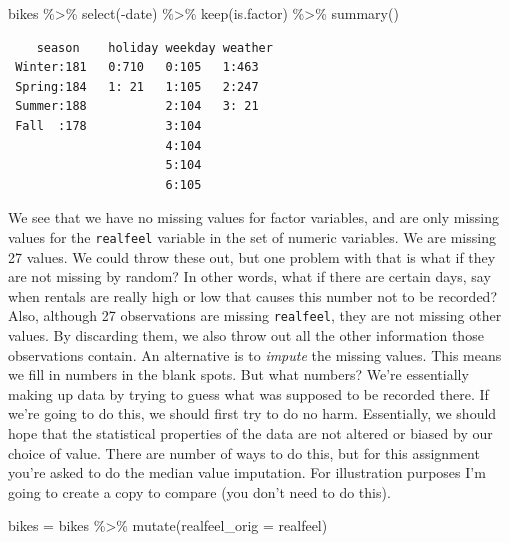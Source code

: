 \documentclass[
  letterpaper,
  DIV=11,
  numbers=noendperiod]{scrartcl}
\newenvironment{Shaded}{\begin{snugshade}}{\end{snugshade}}
\newcommand{\AttributeTok}[1]{\textcolor[rgb]{0.40,0.45,0.13}{#1}}
\newcommand{\FunctionTok}[1]{\textcolor[rgb]{0.28,0.35,0.67}{#1}}
\newcommand{\NormalTok}[1]{\textcolor[rgb]{0.00,0.23,0.31}{#1}}
\newcommand{\OtherTok}[1]{\textcolor[rgb]{0.00,0.23,0.31}{#1}}
\newcommand{\SpecialCharTok}[1]{\textcolor[rgb]{0.37,0.37,0.37}{#1}}
\begin{document}
\begin{Shaded}
\begin{Highlighting}[]
\NormalTok{bikes }\SpecialCharTok{\%\textgreater{}\%}
  \FunctionTok{select}\NormalTok{(}\SpecialCharTok{{-}}\NormalTok{date) }\SpecialCharTok{\%\textgreater{}\%}
  \FunctionTok{keep}\NormalTok{(is.factor) }\SpecialCharTok{\%\textgreater{}\%}
  \FunctionTok{summary}\NormalTok{()}
\end{Highlighting}
\end{Shaded}

\begin{verbatim}
    season    holiday weekday weather
 Winter:181   0:710   0:105   1:463  
 Spring:184   1: 21   1:105   2:247  
 Summer:188           2:104   3: 21  
 Fall  :178           3:104          
                      4:104          
                      5:104          
                      6:105          
\end{verbatim}

We see that we have no missing values for factor variables, and are only
missing values for the \texttt{realfeel} variable in the set of numeric
variables. We are missing 27 values. We could throw these out, but one
problem with that is what if they are not missing by random? In other
words, what if there are certain days, say when rentals are really high
or low that causes this number not to be recorded? Also, although 27
observations are missing \texttt{realfeel}, they are not missing other
values. By discarding them, we also throw out all the other information
those observations contain. An alternative is to \emph{impute} the
missing values. This means we fill in numbers in the blank spots. But
what numbers? We're essentially making up data by trying to guess what
was supposed to be recorded there. If we're going to do this, we should
first try to do no harm. Essentially, we should hope that the
statistical properties of the data are not altered or biased by our
choice of value. There are number of ways to do this, but for this
assignment you're asked to do the median value imputation. For
illustration purposes I'm going to create a copy to compare (you don't
need to do this).

\begin{Shaded}
\begin{Highlighting}[]
\NormalTok{bikes }\OtherTok{=}\NormalTok{ bikes }\SpecialCharTok{\%\textgreater{}\%}
  \FunctionTok{mutate}\NormalTok{(}\AttributeTok{realfeel\_orig =}\NormalTok{ realfeel)}
\end{Highlighting}
\end{Shaded}
\end{document}
